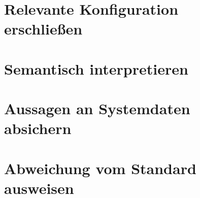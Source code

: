 \section{Relevante Konfiguration erschließen}
\label{sec:impl-erschliessen}

\section{Semantisch interpretieren}
\label{sec:impl-interpretieren}

\section{Aussagen an Systemdaten absichern}
\label{sec:impl-absichern}

\section{Abweichung vom Standard ausweisen}
\label{sec:impl-abweichung}
